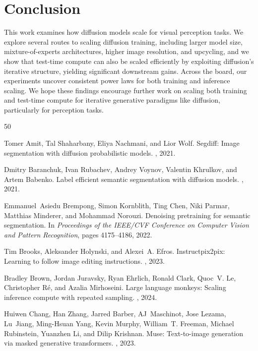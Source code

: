 \documentclass[manuscript,screen,review]{acmart}
\begin{document}
\section{Conclusion}
This work examines how diffusion models scale for visual perception tasks. We explore several
routes to scaling diffusion training, including larger model size, mixture-of-experts architectures,
higher image resolution, and upcycling, and we show that test-time compute can also be scaled
efficiently by exploiting diffusion's iterative structure, yielding significant downstream gains.
Across the board, our experiments uncover consistent power laws for both training and inference
scaling. We hope these findings encourage further work on scaling both training and test-time
compute for iterative generative paradigms like diffusion, particularly for perception tasks.
\begin{thebibliography}{50}

Tomer Amit, Tal Shaharbany, Eliya Nachmani, and Lior Wolf.
\newblock Segdiff: Image segmentation with diffusion probabilistic models.
, 2021.

Dmitry Baranchuk, Ivan Rubachev, Andrey Voynov, Valentin Khrulkov, and Artem Babenko.
\newblock Label efficient semantic segmentation with diffusion models.
, 2021.

Emmanuel~Asiedu Brempong, Simon Kornblith, Ting Chen, Niki Parmar, Matthias Minderer, and Mohammad Norouzi.
\newblock Denoising pretraining for semantic segmentation.
\newblock In {\em Proceedings of the IEEE/CVF Conference on Computer Vision and Pattern Recognition}, pages 4175--4186, 2022.

Tim Brooks, Aleksander Holynski, and Alexei~A. Efros.
\newblock Instructpix2pix: Learning to follow image editing instructions.
, 2023.

Bradley Brown, Jordan Juravsky, Ryan Ehrlich, Ronald Clark, Quoc~V. Le, Christopher R{\'e}, and Azalia Mirhoseini.
\newblock Large language monkeys: Scaling inference compute with repeated sampling.
, 2024.

Huiwen Chang, Han Zhang, Jarred Barber, AJ~Maschinot, Jose Lezama, Lu~Jiang, Ming-Hsuan Yang, Kevin Murphy, William~T. Freeman, Michael Rubinstein, Yuanzhen Li, and Dilip Krishnan.
\newblock Muse: Text-to-image generation via masked generative transformers.
, 2023.


\end{thebibliography}
\end{document}
